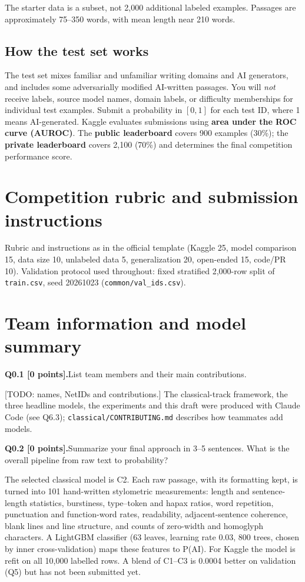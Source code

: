 \documentclass[11pt,letterpaper]{article}
\newcommand{\question}[2]{\needspace{4\baselineskip}\par\addvspace{0.45em}\noindent\textbf{#1}\quad #2\par\nobreak\vspace{0.1em}}
\newcommand{\smallnote}[1]{{\small\color{muted}#1}}
\begin{document}
\smallnote{The starter data is a subset, not 2,000 additional labeled examples. Passages are approximately 75--350 words, with mean length near 210 words.}

\subsection*{How the test set works}
The test set mixes familiar and unfamiliar writing domains and AI generators, and includes some adversarially modified AI-written passages. You will \emph{not} receive labels, source model names, domain labels, or difficulty memberships for individual test examples. Submit a probability in $[0,1]$ for each test ID, where 1 means AI-generated. Kaggle evaluates submissions using \textbf{area under the ROC curve (AUROC)}. The \textbf{public leaderboard} covers 900 examples (30\%); the \textbf{private leaderboard} covers 2,100 (70\%) and determines the final competition performance score.

\vfill
\newpage
\section{Competition rubric and submission instructions}
\smallnote{Rubric and instructions as in the official template (Kaggle 25, model comparison 15, data size 10, unlabeled data 5, generalization 20, open-ended 15, code/PR 10). Validation protocol used throughout: fixed stratified 2,000-row split of \texttt{train.csv}, seed 20261023 (\texttt{common/val\_ids.csv}).}

\section{Team information and model summary}
\question{Q0.1 [0 points].}{List team members and their main contributions.}
{\raggedright [TODO: names, NetIDs and contributions.] The classical-track framework, the three headline models, the experiments and this draft were produced with Claude Code (see Q6.3); \texttt{classical/CONTRIBUTING.md} describes how teammates add models.\par}

\question{Q0.2 [0 points].}{Summarize your final approach in 3--5 sentences. What is the overall pipeline from raw text to probability?}
The selected classical model is C2. Each raw passage, with its formatting kept, is turned into 101 hand-written stylometric measurements: length and sentence-length statistics, burstiness, type--token and hapax ratios, word repetition, punctuation and function-word rates, readability, adjacent-sentence coherence, blank lines and line structure, and counts of zero-width and homoglyph characters. A LightGBM classifier (63 leaves, learning rate 0.03, 800 trees, chosen by inner cross-validation) maps these features to P(AI). For Kaggle the model is refit on all 10,000 labelled rows. A blend of C1--C3 is 0.0004 better on validation (Q5) but has not been submitted yet.
\end{document}
